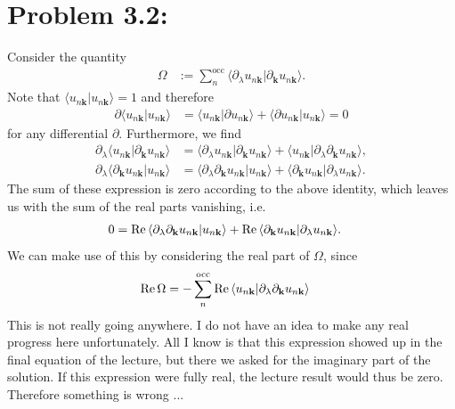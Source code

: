 \documentclass[english, parskip=full]{scrartcl}
\newcommand{\brak}{}
\newcommand{\tecxt}{}
\begin{document}
\newpage
\section*{Problem 3.2: }
Consider the quantity
\begin{align}
\Omega &:= \sum_n^\tecxt\text{occ} \brak\langle \partial_\lambda u_{n\mathbf{k}} | \partial_\mathbf{k} u_{n\mathbf{k}} \rangle .
\end{align}
Note that $\brak\langle u_{n\mathbf{k}} | u_{n\mathbf{k}} \rangle = 1$ and therefore
\begin{align}
\partial \brak\langle u_{n\mathbf{k}} | u_{n\mathbf{k}} \rangle &= \brak\langle u_{n\mathbf{k}} | \partial u_{n\mathbf{k}} \rangle + \brak\langle \partial u_{n\mathbf{k}} | u_{n\mathbf{k}} \rangle = 0
\end{align}
for any differential $\partial$.
Furthermore, we find
\begin{align}
\partial_\lambda \brak\langle u_{n\mathbf{k}} | \partial_\mathbf{k} u_{n\mathbf{k}} \rangle &= \brak\langle \partial_\lambda u_{n\mathbf{k}} | \partial_\mathbf{k} u_{n\mathbf{k}} \rangle + \brak\langle  u_{n\mathbf{k}} | \partial_\lambda \partial_\mathbf{k} u_{n\mathbf{k}} \rangle ,\\
\partial_\lambda \brak\langle \partial_\mathbf{k} u_{n\mathbf{k}} |  u_{n\mathbf{k}} \rangle &= \brak\langle \partial_\lambda \partial_\mathbf{k} u_{n\mathbf{k}} |  u_{n\mathbf{k}} \rangle + \brak\langle \partial_\mathbf{k} u_{n\mathbf{k}} | \partial_\lambda  u_{n\mathbf{k}} \rangle.
\end{align}
The sum of these expression is zero according to the above identity, which leaves us with the sum of the real parts vanishing, i.e.
\begin{align}
0 &= \tecxt\text{Re\,} \brak\langle \partial_\lambda \partial_\mathbf{k} u_{n\mathbf{k}} |  u_{n\mathbf{k}} \rangle + \tecxt\text{Re\,} \brak\langle \partial_\mathbf{k} u_{n\mathbf{k}} | \partial_\lambda  u_{n\mathbf{k}} \rangle.
\end{align}
We can make use of this by considering the real part of $\Omega$, since 
\begin{align}
\tecxt\text{Re\,} \Omega &= -\sum_{n}^{\tecxt\text{occ}} \tecxt\text{Re\,} \brak\langle u_{n\mathbf{k}} |  \partial_\lambda \partial_\mathbf{k} u_{n\mathbf{k}} \rangle
\end{align}
This is not really going anywhere. 
I do not have an idea to make any real progress here unfortunately.
All I know is that this expression showed up in the final equation of the lecture, but there we asked for the imaginary part of the solution. 
If this expression were fully real, the lecture result would thus be zero. 
Therefore something is wrong ...
\end{document}
